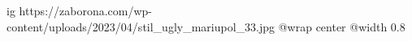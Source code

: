  
 
 
 
 

\ifcmt
  ig https://zaborona.com/wp-content/uploads/2023/04/stil_ugly_mariupol_33.jpg
  @wrap center
  @width 0.8
\fi

